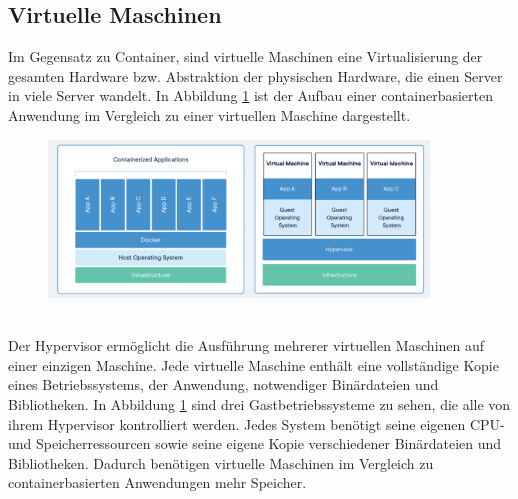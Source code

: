 \subsection{Virtuelle Maschinen}
Im Gegensatz zu Container, sind virtuelle Maschinen eine Virtualisierung der gesamten Hardware bzw. Abstraktion der physischen Hardware, die einen Server in viele Server wandelt. In Abbildung \ref{vm} ist der Aufbau einer containerbasierten Anwendung im Vergleich zu einer virtuellen Maschine dargestellt.
\begin{figure}[bth] 
	\centering
	\includegraphics[width=0.9\textwidth]{Graphics/containerVsVm.png}
	\caption{}
	\label{vm}
	\cite{container}
\end{figure}\\
Der Hypervisor ermöglicht die Ausführung mehrerer virtuellen Maschinen auf einer einzigen Maschine. Jede virtuelle Maschine enthält eine vollständige Kopie eines Betriebssystems, der Anwendung, notwendiger Binärdateien und Bibliotheken. In Abbildung \ref{vm} sind drei Gastbetriebssysteme zu sehen, die alle von ihrem Hypervisor kontrolliert werden. Jedes System benötigt seine eigenen CPU- und Speicherressourcen sowie seine eigene Kopie verschiedener Binärdateien und Bibliotheken. Dadurch benötigen virtuelle Maschinen im Vergleich zu containerbasierten Anwendungen mehr Speicher.

